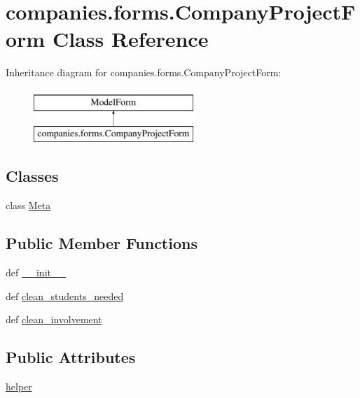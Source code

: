 \hypertarget{classcompanies_1_1forms_1_1_company_project_form}{\section{companies.\-forms.\-Company\-Project\-Form Class Reference}
\label{classcompanies_1_1forms_1_1_company_project_form}
}
Inheritance diagram for companies.\-forms.\-Company\-Project\-Form\-:\begin{figure}[H]
\begin{center}
\leavevmode
\includegraphics[height=2.000000cm]{classcompanies_1_1forms_1_1_company_project_form}
\end{center}
\end{figure}
\subsection*{Classes}
\begin{DoxyCompactItemize}
\item 
class \hyperlink{classcompanies_1_1forms_1_1_company_project_form_1_1_meta}{Meta}
\end{DoxyCompactItemize}
\subsection*{Public Member Functions}
\begin{DoxyCompactItemize}
\item 
def \hyperlink{classcompanies_1_1forms_1_1_company_project_form_aa0cf2728887a44894de66c1df0b17e93}{\-\_\-\-\_\-init\-\_\-\-\_\-}
\item 
def \hyperlink{classcompanies_1_1forms_1_1_company_project_form_aa4c479d82da2fbaef12076c1d7458918}{clean\-\_\-students\-\_\-needed}
\item 
def \hyperlink{classcompanies_1_1forms_1_1_company_project_form_a7e427c94091e49415d6c5bfddac2c0d8}{clean\-\_\-involvement}
\end{DoxyCompactItemize}
\subsection*{Public Attributes}
\begin{DoxyCompactItemize}
\item 
\hyperlink{classcompanies_1_1forms_1_1_company_project_form_acf8255b4f24dbe2570906ee71797e3d4}{helper}
\end{DoxyCompactItemize}
